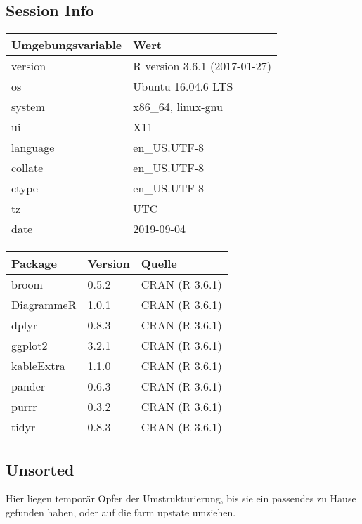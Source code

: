 \documentclass[ngerman,a4paper,]{scrartcl}
\theoremstyle{definition}
\theoremstyle{definition}
\theoremstyle{definition}
\theoremstyle{remark}
\begin{document}
\hypertarget{session-info}{%
\subsection{Session Info}\label{session-info}}

\begin{table}[H]
\centering
\begin{tabular}{ll}
\toprule
Umgebungsvariable & Wert\\
\midrule
version & R version 3.6.1 (2017-01-27)\\
os & Ubuntu 16.04.6 LTS\\
system & x86\_64, linux-gnu\\
ui & X11\\
language & en\_US.UTF-8\\
collate & en\_US.UTF-8\\
ctype & en\_US.UTF-8\\
tz & UTC\\
date & 2019-09-04\\
\bottomrule
\end{tabular}
\end{table}

\begin{table}[H]
\centering
\begin{tabular}{lll}
\toprule
Package & Version & Quelle\\
\midrule
broom & 0.5.2 & CRAN (R 3.6.1)\\
DiagrammeR & 1.0.1 & CRAN (R 3.6.1)\\
dplyr & 0.8.3 & CRAN (R 3.6.1)\\
ggplot2 & 3.2.1 & CRAN (R 3.6.1)\\
kableExtra & 1.1.0 & CRAN (R 3.6.1)\\
pander & 0.6.3 & CRAN (R 3.6.1)\\
purrr & 0.3.2 & CRAN (R 3.6.1)\\
tidyr & 0.8.3 & CRAN (R 3.6.1)\\
\bottomrule
\end{tabular}
\end{table}

\hypertarget{unsorted}{%
\subsection{Unsorted}\label{unsorted}}

Hier liegen temporär Opfer der Umstrukturierung, bis sie ein passendes zu Hause gefunden haben, oder auf die farm upstate umziehen.
\end{document}
